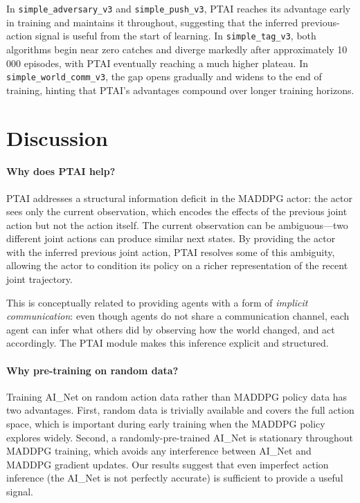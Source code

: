 \documentclass[12pt]{article}
\begin{document}
In \texttt{simple\_adversary\_v3} and \texttt{simple\_push\_v3}, PTAI reaches its
advantage early in training and maintains it throughout, suggesting that the inferred
previous-action signal is useful from the start of learning. In \texttt{simple\_tag\_v3},
both algorithms begin near zero catches and diverge markedly after approximately 10\,000
episodes, with PTAI eventually reaching a much higher plateau. In
\texttt{simple\_world\_comm\_v3}, the gap opens gradually and widens to the end of
training, hinting that PTAI's advantages compound over longer training horizons.

\section{Discussion}

\paragraph{Why does PTAI help?}
PTAI addresses a structural information deficit in the MADDPG actor: the actor sees only
the current observation, which encodes the effects of the previous joint action but not
the action itself. The current observation can be ambiguous---two different joint actions
can produce similar next states. By providing the actor with the inferred previous joint
action, PTAI resolves some of this ambiguity, allowing the actor to condition its policy
on a richer representation of the recent joint trajectory.

This is conceptually related to providing agents with a form of \emph{implicit
communication}: even though agents do not share a communication channel, each agent can
infer what others did by observing how the world changed, and act accordingly. The PTAI
module makes this inference explicit and structured.

\paragraph{Why pre-training on random data?}
Training AI\_Net on random action data rather than MADDPG policy data has two advantages.
First, random data is trivially available and covers the full action space, which
is important during early training when the MADDPG policy explores widely. Second, a
randomly-pre-trained AI\_Net is stationary throughout MADDPG training, which avoids any
interference between AI\_Net and MADDPG gradient updates. Our results suggest that even
imperfect action inference (the AI\_Net is not perfectly accurate) is sufficient to
provide a useful signal.
\end{document}
